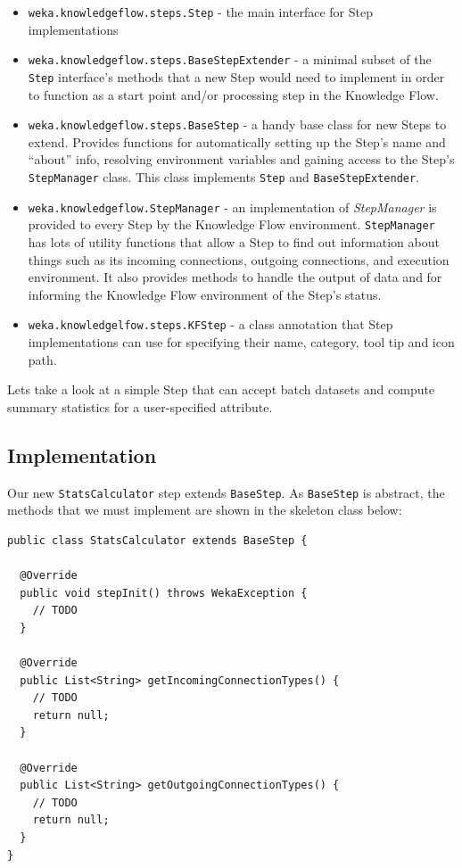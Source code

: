 \begin{itemize}
\item \texttt{weka.knowledgeflow.steps.Step} - the main interface for Step implementations
\item \texttt{weka.knowledgeflow.steps.BaseStepExtender} - a minimal subset of the
  \texttt{Step} interface's methods that a new Step would need to
  implement in order to function as a start point and/or processing
  step in the Knowledge Flow.
\item \texttt{weka.knowledgeflow.steps.BaseStep} - a handy base class
  for new Steps to extend. Provides functions for automatically setting up 
  the Step's name and ``about'' info, resolving environment variables
  and gaining access to the Step's \texttt{StepManager} class. This
  class implements \texttt{Step} and \texttt{BaseStepExtender}.
\item \texttt{weka.knowledgeflow.StepManager} - an implementation of
  \textit{StepManager} is provided to every Step by the Knowledge Flow
  environment. \texttt{StepManager} has lots of utility functions that
  allow a Step to find out information about things such as its
  incoming connections, outgoing connections, and execution
  environment. It also provides methods to handle the output of data
  and for informing the Knowledge Flow environment of the Step's
  status.
\item \texttt{weka.knowledgelfow.steps.KFStep} - a class annotation
  that Step implementations can use for specifying their name,
  category, tool tip and icon path.
\end{itemize}

Lets take a look at a simple Step that can accept batch datasets and
compute summary statistics for a user-specified attribute.

\subsection*{Implementation}

Our new \texttt{StatsCalculator} step extends \texttt{BaseStep}. As \texttt{BaseStep}
is abstract, the methods that we must implement are shown in the skeleton class below:

\begin{verbatim}
public class StatsCalculator extends BaseStep {

  @Override
  public void stepInit() throws WekaException {
    // TODO
  }

  @Override
  public List<String> getIncomingConnectionTypes() {
    // TODO
    return null;
  }

  @Override
  public List<String> getOutgoingConnectionTypes() {
    // TODO
    return null;
  }
}
\end{verbatim}

